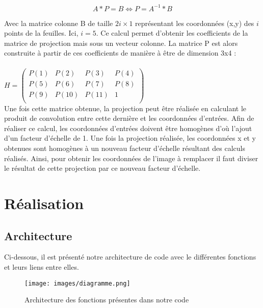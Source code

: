 \documentclass[blue]{ceri/sty/rapport}
\begin{document}
 \begin{equation}
   A*P=B \Leftrightarrow P=A^{-1}*B
\end{equation}

Avec la matrice colonne B de taille $2i\times1$ représentant les coordonnées (x,y) des $i$ points de la feuilles. Ici, $i=5$.
Ce calcul permet d'obtenir les coefficients de la matrice de projection mais sous un vecteur colonne. La matrice P est alors construite à partir de ces coefficients de manière à être de dimension 3x4 : \\
\\

$H = \begin{pmatrix}P(1)&P(2)&P(3)&P(4)\\ 
P(5)&P(6)&P(7)&P(8)\\ 
P(9)&P(10)&P(11)&1\\ 
\end{pmatrix}$ 
\\

Une fois cette matrice obtenue, la projection peut être réalisée en calculant le produit de convolution entre cette dernière et les coordonnées d'entrées. Afin de réaliser ce calcul, les coordonnées d'entrées doivent être homogènes d'où l'ajout d'un facteur d'échelle de 1. 
Une fois la projection réalisée, les coordonnées x et y obtenues sont homogènes à un nouveau facteur d'échelle résultant des calculs réalisés. Ainsi, pour obtenir les coordonnées de l'image à remplacer il faut diviser le résultat de cette projection par ce nouveau facteur d'échelle.

\section{Réalisation}
\label{sec:Réalsiation}

\subsection{Architecture}

Ci-dessous, il est présenté notre architecture de code avec le différentes fonctions et leurs liens entre elles.

\begin{figure}[H]
\centering
\texttt{[image: images/diagramme.png]}
\caption{Architecture des fonctions présentes dans notre code} %
\end{figure}
\end{document}

